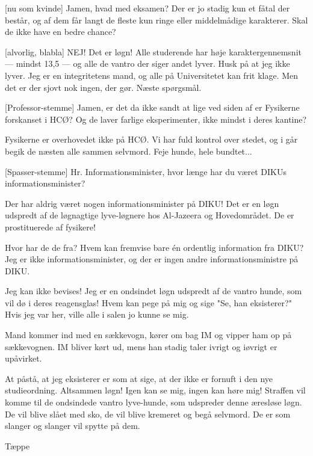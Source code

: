 \documentclass[a4paper]{article}
\begin{document}
\begin{sketch}
[nu som kvinde] Jamen, hvad med eksamen? Der er jo stadig kun
et fåtal der består, og af dem får langt de fleste kun ringe eller
middelmådige karakterer. Skal de ikke have en bedre chance?

[alvorlig, blabla] NEJ! Det er løgn! Alle studerende har høje
karaktergennemsnit --- mindst 13,5 --- og alle de vantro der siger
andet lyver. Husk på at jeg ikke lyver. Jeg er en integritetens mand,
og alle på Universitetet kan frit klage. Men det er der sjovt nok
ingen, der gør.  Næste spørgsmål.

[Professor-stemme] Jamen, er det da ikke sandt at lige ved siden af er
Fysikerne forskanset i HCØ? Og de laver farlige eksperimenter, ikke
mindst i deres kantine?

 Fysikerne er overhovedet ikke på HCØ. Vi har fuld kontrol
over stedet, og i går begik de næsten alle sammen selvmord. Feje
hunde, hele bundtet...


[Spasser-stemme] Hr. Informationsminister,
hvor længe har du været DIKUs informationsminister?

  Der har aldrig været nogen informationsminister på DIKU!
Det er en løgn udspredt af de løgnagtige lyve-løgnere hos
Al-Jazeera og Hovedområdet. De er prostituerede af fysikere!

Hvor har de de fra? Hvem kan fremvise bare én ordentlig information fra DIKU?
Jeg er ikke informationsminister, og der er ingen andre
informationsministre på DIKU.

Jeg kan ikke bevises! Jeg er en ondsindet løgn udspredt af de
vantro hunde, som vil dø i deres reagensglas! Hvem kan pege på
mig  og sige "Se, han
eksisterer?" Hvis jeg var her, ville alle i salen jo kunne se mig.

\scene Mand kommer ind med en sækkevogn, kører om bag IM og vipper ham op på
sækkevognen. IM bliver kørt ud, mens han stadig taler ivrigt og iøvrigt
er upåvirket.

 At påstå, at jeg eksisterer er som at sige, at der ikke er
fornuft i den nye studieordning. Altsammen løgn! Igen kan se mig,
ingen kan høre mig!  Straffen vil komme til de ondsindede vantro
lyve-hunde, som udspreder denne æresløse løgn. De vil blive slået med
sko, de vil blive kremeret og begå selvmord. De er som slanger og
slanger vil spytte på dem.

\scene Tæppe

\end{sketch}
\end{document}
